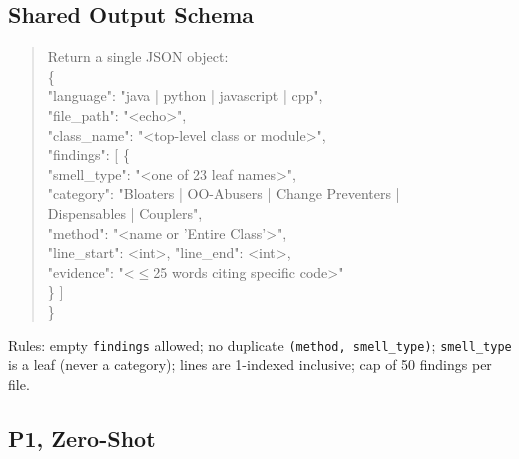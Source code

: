 \documentclass[conference]{IEEEtran}
\begin{document}
\subsection{Shared Output Schema}

\begin{quote}\small\ttfamily
Return a single JSON object:\\
\{\\
\hspace*{1em}"language": "java | python | javascript | cpp",\\
\hspace*{1em}"file\_path": "<echo>",\\
\hspace*{1em}"class\_name": "<top-level class or module>",\\
\hspace*{1em}"findings": [ \{\\
\hspace*{2em}"smell\_type": "<one of 23 leaf names>",\\
\hspace*{2em}"category": "Bloaters | OO-Abusers | Change Preventers |\\
\hspace*{3em}Dispensables | Couplers",\\
\hspace*{2em}"method": "<name or 'Entire Class'>",\\
\hspace*{2em}"line\_start": <int>, "line\_end": <int>,\\
\hspace*{2em}"evidence": "<$\le$25 words citing specific code>"\\
\hspace*{1em}\} ]\\
\}
\end{quote}

\noindent Rules: empty \texttt{findings} allowed; no duplicate
\texttt{(method, smell\_type)}; \texttt{smell\_type} is a leaf (never a
category); lines are 1-indexed inclusive; cap of 50 findings per file.

\subsection{P1, Zero-Shot}
\end{document}
